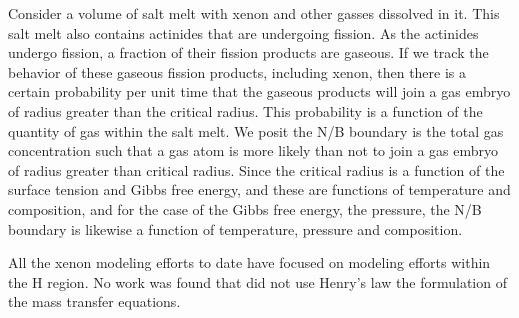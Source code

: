 Consider a volume of salt melt with xenon and other gasses dissolved in it. This salt melt also contains actinides that are undergoing fission.  As the actinides undergo fission, a fraction of their fission products are gaseous.  If we track the behavior of these gaseous fission products, including xenon, then there is a certain probability per unit time that the gaseous products will join a gas embryo of radius greater than the critical radius.  This probability is a function of the quantity of gas within the salt melt.  We posit the N/B boundary is the total gas concentration such that a gas atom is more likely than not to join a gas embryo of radius greater than critical radius.  Since the critical radius is a function of the surface tension and Gibbs free energy, and these are functions of temperature and composition, and for the case of the Gibbs free energy, the pressure, the N/B boundary is likewise a function of temperature, pressure and composition.

All the xenon modeling efforts to date have focused on modeling efforts within the H region.  No work was found that did not use Henry's law the formulation of the mass transfer equations.